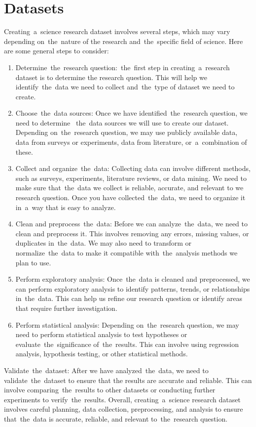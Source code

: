     \section{Datasets}\label{subsec:datasets}
        Creating~a~science research dataset involves several steps, which may vary depending on~the~nature of the
        research and~the~specific field of science. Here are some general steps to consider:
        \begin{enumerate}
            \item Determine~the~research question:~the~first step in creating~a~research dataset is to determine the
            research question. This will help we identify~the~data we need to collect and~the~type of dataset
            we need to create.
            \item Choose~the~data sources: Once we have identified~the~research question, we need to determine
           ~the~data sources we will use to create our dataset. Depending on~the~research question, we may use
            publicly available data, data from surveys or experiments, data from literature, or~a~combination of these.
            \item Collect and organize~the~data: Collecting data can involve different methods, such as surveys,
            experiments, literature reviews, or data mining. We need to make sure that~the~data we collect is reliable,
            accurate, and relevant to we research question. Once you have collected~the~data, we need to organize
            it in~a~way that is easy to analyze.
            \item Clean and preprocess~the~data: Before we can analyze~the~data, we need to clean and preprocess it.
            This involves removing any errors, missing values, or duplicates in~the~data. We may also need to
            transform or normalize~the~data to make it compatible with~the~analysis methods we plan to use.
            \item Perform exploratory analysis: Once~the~data is cleaned and preprocessed, we can perform exploratory
            analysis to identify patterns, trends, or relationships in~the~data. This can help us refine our research
            question or identify areas that require further investigation.
            \item Perform statistical analysis: Depending on~the~research question, we may need to perform statistical
            analysis to test hypotheses or evaluate~the~significance of~the~results. This can involve using regression
            analysis, hypothesis testing, or other statistical methods.
        \end{enumerate}
        Validate~the~dataset: After we have analyzed~the~data, we need to validate~the~dataset to ensure that the
        results are accurate and reliable. This can involve comparing~the~results to other datasets or conducting
        further experiments to verify~the~results. Overall, creating~a~science research dataset involves careful
        planning, data collection, preprocessing, and analysis to ensure that~the~data is accurate, reliable, and
        relevant to~the~research question.
